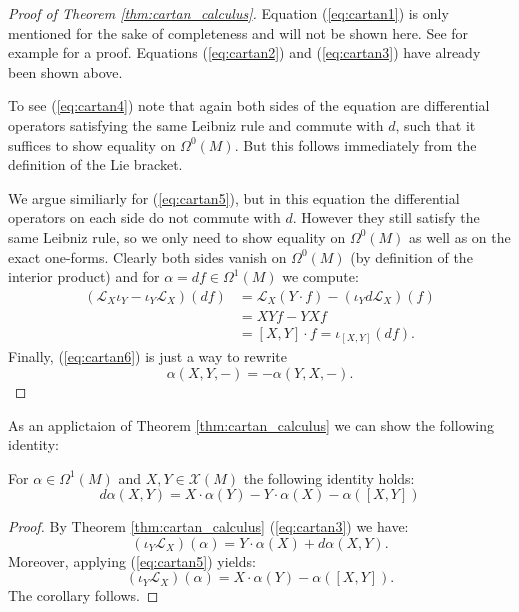 \begin{proof}[Proof of Theorem \ref{thm:cartan_calculus}]
    Equation (\ref{eq:cartan1}) is only mentioned for the sake of completeness and will not be shown here. See for example \cite{steimle_geometrie} for a proof. Equations (\ref{eq:cartan2}) and (\ref{eq:cartan3}) have already been shown above. 
    
    To see (\ref{eq:cartan4}) note that again both sides of the equation are differential operators satisfying the same Leibniz rule and commute with $d$, such that it suffices to show equality on $\Omega^0(M)$. But this follows immediately from the definition of the Lie bracket.

    We argue similiarly for (\ref{eq:cartan5}), but in this equation the differential operators on each side do not commute with $d$. However they still satisfy the same Leibniz rule, so we only need to show equality on $\Omega^0(M)$ as well as on the exact one-forms. Clearly both sides vanish on $\Omega^0(M)$ (by definition of the interior product) and for $\alpha = df \in \Omega^1(M)$ we compute:
    \begin{align*}
        (\mathcal{L}_X\iota_Y - \iota_Y\mathcal{L}_X)(df) & = \mathcal{L}_X(Y \cdot f) - (\iota_Y d \mathcal{L}_X)(f) \\
        &= XYf - YXf\\
        &= [X,Y] \cdot f = \iota_{[X,Y]}(df).
    \end{align*}
    Finally, (\ref{eq:cartan6}) is just a way to rewrite
    \[
    \alpha(X,Y,-) = -\alpha(Y,X,-).
    \]
\end{proof}

As an applictaion of Theorem \ref{thm:cartan_calculus} we can show the following identity:

\begin{corollary}
    \label{cartan_cal:cor:formula_d_alpha}
    For $\alpha \in \Omega^1(M)$ and $X,Y \in \mathscr{X}(M)$ the following identity holds:
    \[
    d\alpha(X,Y) = X \cdot \alpha(Y) - Y \cdot \alpha(X) - \alpha([X,Y])
    \]
\end{corollary}
\begin{proof}
    By Theorem \ref{thm:cartan_calculus} (\ref{eq:cartan3}) we have:
    \[
    (\iota_Y\mathcal{L}_X)(\alpha) = Y \cdot \alpha(X) + d\alpha(X,Y).
    \]
    Moreover, applying (\ref{eq:cartan5}) yields:
    \[
    (\iota_Y\mathcal{L}_X)(\alpha) = X \cdot \alpha(Y) - \alpha([X,Y]).
    \]
    The corollary follows.
\end{proof}

